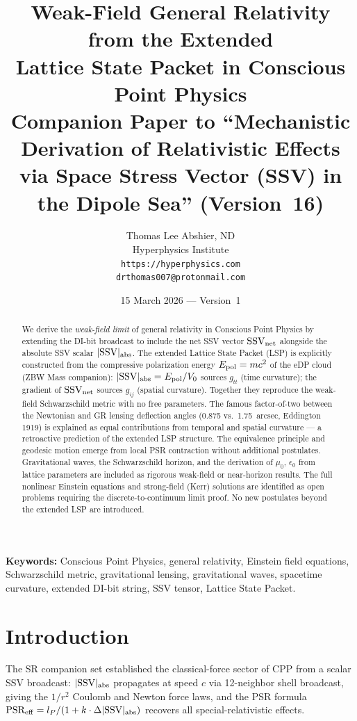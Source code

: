 \documentclass[12pt]{article}
\title{\textbf{Weak-Field General Relativity from the Extended\\
Lattice State Packet in Conscious Point Physics}\\[6pt]
{\large Companion Paper to ``Mechanistic Derivation of Relativistic Effects\\
via Space Stress Vector (SSV) in the Dipole Sea'' (Version~16)}}
\author{Thomas Lee Abshier, ND\\
Hyperphysics Institute\\
\texttt{https://hyperphysics.com}\\
\texttt{drthomas007@protonmail.com}}
\date{15 March 2026 --- Version~1}
\newcommand{\lP}{l_P}
\newcommand{\SSV}{\text{SSV}}
\newcommand{\PSR}{\text{PSR}}
\begin{document}
\maketitle

\noindent\textbf{Keywords:} Conscious Point Physics, general relativity,
Einstein field equations, Schwarzschild metric, gravitational lensing,
gravitational waves, spacetime curvature, extended DI-bit string,
SSV tensor, Lattice State Packet.

\begin{abstract}
We derive the \emph{weak-field limit} of general relativity in Conscious
Point Physics by extending the DI-bit broadcast to include the net SSV
vector $\mathbf{\SSV}_{\rm net}$ alongside the absolute SSV scalar
$|\SSV|_{\rm abs}$.  The extended Lattice State Packet (LSP) is explicitly
constructed from the compressive polarization energy $E_{\rm pol} = mc^2$
of the eDP cloud (ZBW Mass companion): $|\SSV|_{\rm abs} = E_{\rm pol}/V_0$
sources $g_{tt}$ (time curvature); the gradient of $\mathbf{\SSV}_{\rm net}$
sources $g_{ij}$ (spatial curvature).  Together they reproduce the
weak-field Schwarzschild metric with no free parameters.  The famous
factor-of-two between the Newtonian and GR lensing deflection angles
(0.875 vs.\ 1.75~arcsec, Eddington 1919) is explained as equal
contributions from temporal and spatial curvature — a retroactive
prediction of the extended LSP structure.  The equivalence principle
and geodesic motion emerge from local PSR contraction without additional
postulates.  Gravitational waves, the Schwarzschild horizon, and the
derivation of $\mu_0$, $\epsilon_0$ from lattice parameters are included
as rigorous weak-field or near-horizon results.  The full nonlinear
Einstein equations and strong-field (Kerr) solutions are identified as
open problems requiring the discrete-to-continuum limit proof.
No new postulates beyond the extended LSP are introduced.
\end{abstract}

\section{Introduction}
\label{sec:intro}

The SR companion set established the classical-force sector of CPP from a
scalar SSV broadcast: $|\SSV|_{\rm abs}$ propagates at speed $c$ via
12-neighbor shell broadcast, giving the $1/r^2$ Coulomb and Newton force
laws, and the PSR formula $\PSR_{\rm eff} = \lP/(1+k\cdot\Delta|\SSV|_{\rm abs})$
recovers all special-relativistic effects.
\end{document}
